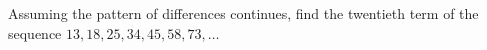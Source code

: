Assuming the pattern of differences continues, find the twentieth term of the sequence $13, 18, 25, 34, 45, 58, 73,\dots$
